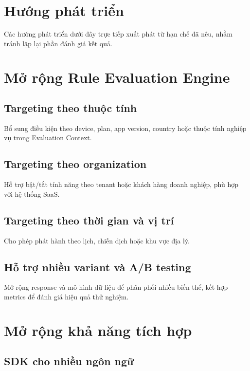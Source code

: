 \section{Hướng phát triển}

Các hướng phát triển dưới đây trực tiếp xuất phát từ hạn chế đã nêu, nhằm tránh lặp lại phần đánh giá kết quả.

\section{Mở rộng Rule Evaluation Engine}

\subsection{Targeting theo thuộc tính}

Bổ sung điều kiện theo device, plan, app version, country hoặc thuộc tính nghiệp vụ trong Evaluation Context.

\subsection{Targeting theo organization}

Hỗ trợ bật/tắt tính năng theo tenant hoặc khách hàng doanh nghiệp, phù hợp với hệ thống SaaS.

\subsection{Targeting theo thời gian và vị trí}

Cho phép phát hành theo lịch, chiến dịch hoặc khu vực địa lý.

\subsection{Hỗ trợ nhiều variant và A/B testing}

Mở rộng response và mô hình dữ liệu để phân phối nhiều biến thể, kết hợp metrics để đánh giá hiệu quả thử nghiệm.

\section{Mở rộng khả năng tích hợp}

\subsection{SDK cho nhiều ngôn ngữ}

